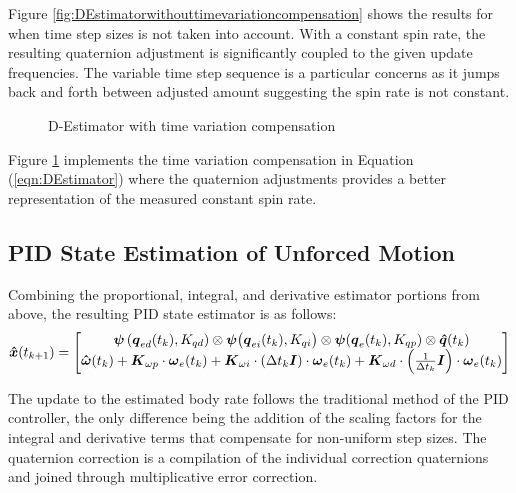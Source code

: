 Figure \ref{fig:DEstimatorwithouttimevariationcompensation} shows the results for when time step sizes is not taken into account.  With a constant spin rate, the resulting quaternion adjustment is significantly coupled to the given update frequencies.  The variable time step sequence is a particular concerns as it jumps back and forth between adjusted amount suggesting the spin rate is not constant.

\begin{figure}[H]
  \centerline{}
  \caption{D-Estimator with time variation compensation}
  \label{fig:DEstimatorwithtimevariationcompensation}
\end{figure}

Figure \ref{fig:DEstimatorwithtimevariationcompensation} implements the time variation compensation in Equation (\ref{eqn:DEstimator}) where the quaternion adjustments provides a better representation of the measured constant spin rate.

\subsection{PID State Estimation of Unforced Motion}
\label{subsec:PIDEstimatorofUnforcedMotion}

Combining the proportional, integral, and derivative estimator portions from above, the resulting PID state estimator is as follows:
\begin{equation}
  \boldsymbol{\hat{x}}(t_{k+1}) = \begin{bmatrix} \boldsymbol{\psi}\left(\boldsymbol{q}_{ed}(t_k), K_{qd}\right) \otimes \boldsymbol{\psi}\big(\boldsymbol{q}_{ei}(t_k), K_{qi}\big) \otimes \boldsymbol{\psi}(\boldsymbol{q}_e(t_{k}), K_{qp})  \otimes \boldsymbol{\hat{q}}(t_{k}) \\
  \boldsymbol{\hat{\omega}}(t_{k}) + \boldsymbol{K}_{\omega p} \cdot \boldsymbol{\omega}_e(t_{k}) + \boldsymbol{K}_{\omega i} \cdot (\Delta t_k \boldsymbol{I})\cdot \boldsymbol{\omega}_e(t_{k}) + \boldsymbol{K}_{\omega d} \cdot \left(\frac{1}{\Delta t_k} \boldsymbol{I}\right) \cdot \boldsymbol{\omega}_e(t_{k}) \end{bmatrix}
  \label{eqn:PIDEstimatorUnforcedMotion}
\end{equation}

The update to the estimated body rate follows the traditional method of the PID controller, the only difference being the addition of the scaling factors for the integral and derivative terms that compensate for non-uniform step sizes.  The quaternion correction is a compilation of the individual correction quaternions and joined through multiplicative error correction.

